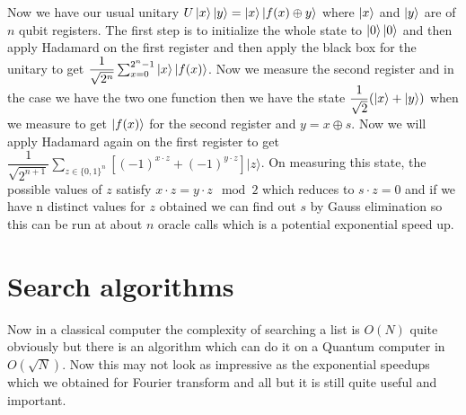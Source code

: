 \documentclass{report}
\begin{document}
Now we have our usual unitary $U\ket{x}\ket{y} = \ket{x}\ket{f(x) \oplus y}$ where $\ket{x}$ and $\ket{y}$ are of $n$ qubit registers. The first step is to initialize the whole state to $\ket{0}\ket{0}$ and then apply Hadamard on the first register and then apply the black box for the unitary to get $\dfrac{1}{\sqrt{2^n}}\sum_{x=0}^{2^n-1}\ket{x}\ket{f(x)}$. Now we measure the second register and in the case we have the two one function then we have the state $\dfrac{1}{\sqrt{2}}(\ket{x} + \ket{y})$ when we measure to get $\ket{f(x)}$ for the second register and $y = x \oplus s$. Now we will apply Hadamard again on the first register to get   $\dfrac{1}{\sqrt{2^{n+1}}} \sum_{z \in \{0,1\}^{n} } \left[  (-1)^{x \cdot z} + (-1)^{y \cdot z} \right]  \lvert z \rangle$. On measuring this state, the possible values of $z$ satisfy $x \cdot z = y \cdot z \mod 2$ which reduces to $s \cdot z = 0$ and if we have n distinct values for $z$ obtained we can find out $s$ by Gauss elimination so this can be run at about $n$ oracle calls which is a potential exponential speed up.



\section{Search algorithms}
Now in a classical computer the complexity of searching a list is $O(N)$ quite obviously but there is an algorithm which can do it on a Quantum computer in $O(\sqrt{N})$. Now this may not look as impressive as the exponential speedups which we obtained for Fourier transform and all but it is still quite useful and important.
\end{document}
